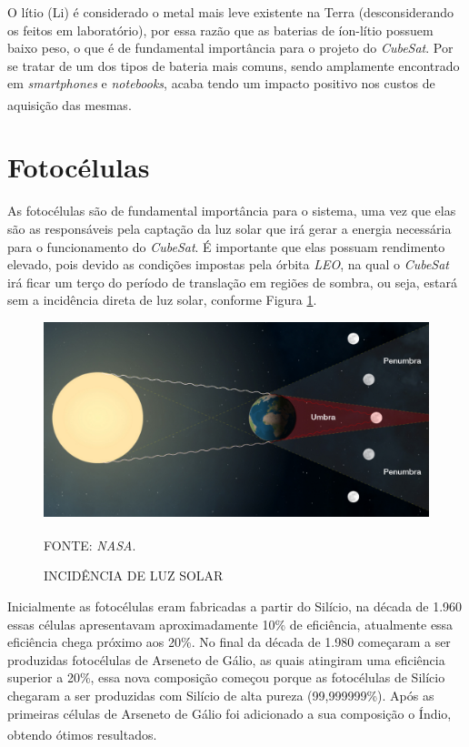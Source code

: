\documentclass[
	12pt,				%
	openright,			%
	oneside,			%
	a4paper,			%
	english,			%
	french,				%
	spanish,			%
	brazil,				%
	oldfontcommands
	]{abntex2}
\begin{document}
	O lítio (Li) é considerado o metal mais leve existente na Terra (desconsiderando os feitos em laboratório), por essa razão que as baterias de íon-lítio possuem baixo peso, o que é de fundamental importância para o projeto do \textit{CubeSat}. Por se tratar de um dos tipos de bateria mais comuns, sendo amplamente encontrado em \textit{smartphones} e \textit{notebooks}, acaba tendo um impacto positivo nos custos de aquisição das mesmas.\textsuperscript{\cite{TecMundo}}
	
\section[Fotocélulas]{Fotocélulas} \label{Cap_Cell}

	As fotocélulas são de fundamental importância para o sistema, uma vez que elas são as responsáveis pela captação da luz solar que irá gerar a energia necessária para o funcionamento do \textit{CubeSat}. É importante que elas possuam rendimento elevado, pois devido as condições impostas pela órbita \textit{LEO}, na qual o \textit{CubeSat} irá ficar um terço do período de translação em regiões de sombra, ou seja, estará sem a incidência direta de luz solar, conforme Figura \ref{Fig_Cone_Solar}.
	
	\begin{figure}[th]
		\caption{INCIDÊNCIA DE LUZ SOLAR}
		\label{Fig_Cone_Solar}
		\centering
		\includegraphics[width=0.7\linewidth]{./figs/cone_solar}
			
		\begin{small}
			FONTE: \textit{NASA}.\textsuperscript{\cite{NASA3}}
		\end{small}		
	\end{figure}
	
	Inicialmente as fotocélulas eram fabricadas a partir do Silício, na década de 1.960 essas células apresentavam aproximadamente 10\% de eficiência, atualmente essa eficiência chega próximo aos 20\%. No final da década de 1.980 começaram a ser produzidas fotocélulas de Arseneto de Gálio, as quais atingiram uma eficiência superior a 20\%, essa nova composição começou porque as fotocélulas de Silício chegaram a ser produzidas com Silício de alta pureza (99,999999\%). Após as primeiras células de Arseneto de Gálio foi adicionado a sua composição o Índio, obtendo ótimos resultados.\textsuperscript{\cite{Fatemi}}
	
\end{document}
